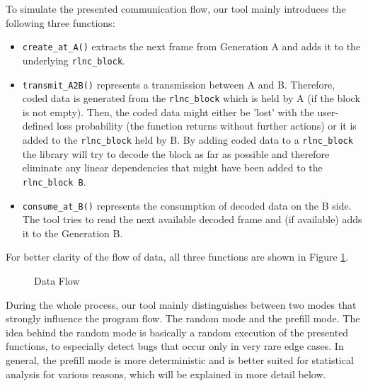 \documentclass[a4paper,english,10pt]{tumarticle}
\begin{document}
To simulate the presented communication flow, our tool mainly introduces the following three functions:
\begin{itemize}
  \item \texttt{create\_at\_A()} extracts the next frame from Generation A and adds it to the
  underlying \texttt{rlnc\_block}. 
  \item \texttt{transmit\_A2B()} represents a transmission between A and B. Therefore, coded data is
generated from the \texttt{rlnc\_block} which is held by A (if the block is not empty). Then, the
coded data might either be 'lost' with the user-defined loss probability (the function returns
without further actions) or it is added to the \texttt{rlnc\_block} held by B. By adding coded data
to a \texttt{rlnc\_block} the library will try to decode the block as far as possible and therefore
eliminate any linear dependencies that might have been added to the \texttt{rlnc\_block B}.
\item \texttt{consume\_at\_B()} represents the consumption of decoded data on the B side. 
The tool tries to read the next available decoded frame and (if available) adds it to the Generation B.
\end{itemize}


For better clarity of the flow of data, all three functions are shown in Figure \ref{fig:func}.

\begin{figure}[h]
  \center
  \caption{Data Flow}
  \label{fig:func}
\end{figure}

During the whole process, our tool mainly distinguishes between two modes that strongly influence the program flow. 
The random mode and the prefill mode. 
The idea behind the random mode is basically a random execution of the presented functions, 
to especially detect bugs that occur only in very rare edge cases.
In general, the prefill mode is more deterministic and is better suited for 
statistical analysis for various reasons, which will be explained in more detail below.
\end{document}
